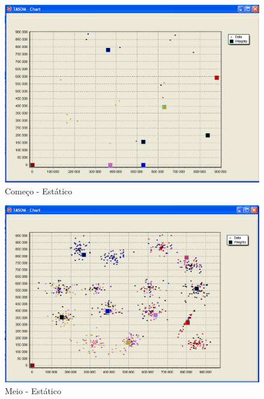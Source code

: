 \begin{figure}[!h]
\centering
\includegraphics[keepaspectratio=true,scale=0.5]
{figuras/tasom1.eps}
\caption{Começo - Estático}
\label{data_titatic}
\end{figure}  

\begin{figure}[!h]
\centering
\includegraphics[keepaspectratio=true,scale=0.5]
{figuras/tasom2.eps}
\caption{Meio - Estático}
\label{data_titatic}
\end{figure}

